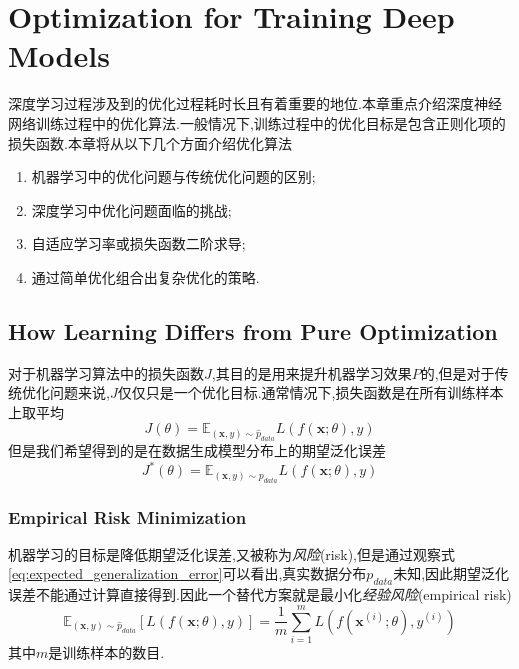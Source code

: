 \chapter{Optimization for Training Deep Models}

深度学习过程涉及到的优化过程耗时长且有着重要的地位.本章重点介绍深度神经网络训练过程中的优化算法.一般情况下,训练过程中的优化目标是包含正则化项的损失函数.本章将从以下几个方面介绍优化算法
\begin{enumerate}
    \item 机器学习中的优化问题与传统优化问题的区别;
    \item 深度学习中优化问题面临的挑战;
    \item 自适应学习率或损失函数二阶求导;
    \item 通过简单优化组合出复杂优化的策略.
\end{enumerate}

\section{How Learning Differs from Pure Optimization}

对于机器学习算法中的损失函数$J$,其目的是用来提升机器学习效果$P$的,但是对于传统优化问题来说,$J$仅仅只是一个优化目标.通常情况下,损失函数是在所有训练样本上取平均
\begin{equation}
J(\theta)=\mathbb E_{(\mathbf x,y)\sim\hat p_{data}}L(f(\mathbf x;\theta),y)
\end{equation}
但是我们希望得到的是在数据生成模型分布上的期望泛化误差
\begin{equation}\label{eq:expected_generalization_error}
J^\ast(\theta)=\mathbb E_{(\mathbf x,y)\sim p_{data}}L(f(\mathbf x;\theta),y)
\end{equation}

\subsection{Empirical Risk Minimization}

机器学习的目标是降低期望泛化误差,又被称为\textit{风险}(risk),但是通过观察式\ref{eq:expected_generalization_error}可以看出,真实数据分布$p_{data}$未知,因此期望泛化误差不能通过计算直接得到.因此一个替代方案就是最小化\textit{经验风险}(empirical risk)
\begin{equation}
\mathbb E_{(\mathbf x,y)\sim\hat p_{data}}\left[L(f(\mathbf x;\theta),y)\right]=\frac{1}{m}\sum_{i=1}^mL(f(\mathbf x^{(i)};\theta),y^{(i)})
\end{equation}
其中$m$是训练样本的数目.

